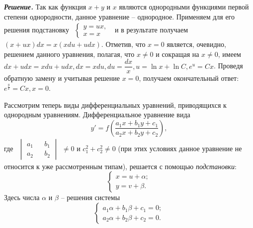 \documentclass{article}
\begin{document}
\begin{justify}
\textbf{\textit{Решение.}} Так как функция $x+y$ и $x$ являются однородными функциями первой
степени однородности, данное уравнение -- однородное. Применяем для его решения подстановку
$\begin{aligned}
    \begin{cases}
        y=ux,\\
        x=x
    \end{cases}
\end{aligned}$
и в результате получаем $(x+ux)dx=x(xdu+udx)$. Отметив, что $x=0$ является, очевидно, решением
данного уравнения, полагая, что $x\ne0$ и сокращая на $x\ne0$, имеем $dx+udx=xdu+udx, dx=xdu,
du=\dfrac{dx}{x}, u=\ln x+ \ln C, e^u=Cx$. Проведя обратную замену и учитывая решение $x=0$,
получаем окончательный ответ: $e^{\frac{y}{x}}=Cx, x=0$.

\quad Рассмотрим теперь виды дифференциальных уравнений, приводящихся к однородным уравнениям.
Дифференциальное уравнение вида
\begin{equation}
    y'=f\left(\dfrac{a_1x+b_1y+c_1}{a_2x+b_2y+c_2}\right), \tag{6.4}
\end{equation}
где
$\begin{aligned}
    \begin{vmatrix}
        a_1 && b_1 \\
        a_2 && b_2
    \end{vmatrix}
\end{aligned} \ne 0$
и $c_1^2+c_2^2 \ne 0$ (при этих условиях данное уравнение не относится к уже рассмотренным
типам), решается с помощью \textit{подстановки}:
\begin{equation}
    \begin{cases}
        x=u+\alpha; \\
        y=v+\beta.
    \end{cases} \tag{6.5}
\end{equation}
Здесь числа $\alpha$ и $\beta$ -- решения системы
\begin{equation}
    \begin{cases}
        a_1\alpha+b_1\beta+c_1=0; \\
        a_2\alpha+b_2\beta+c_2=0.
    \end{cases} \tag{6.6}
\end{equation}



\end{justify}
\end{document}
